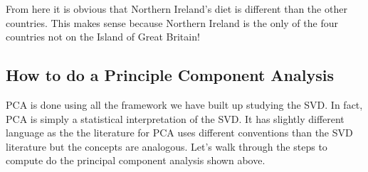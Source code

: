 \documentclass{article}
\begin{document}
From here it is obvious that Northern Ireland's diet is different than the other countries. This makes sense because Northern Ireland is the only of the four countries not on the Island of Great Britain!

\subsection{How to do a Principle Component Analysis}
PCA is done using all the framework we have built up studying the SVD. In fact, PCA is simply a statistical interpretation of the SVD. It has slightly different language as the the literature for PCA uses different conventions than the SVD literature but the concepts are analogous. Let's walk through the steps to compute do the principal component analysis shown above.
\bigskip
\end{document}
